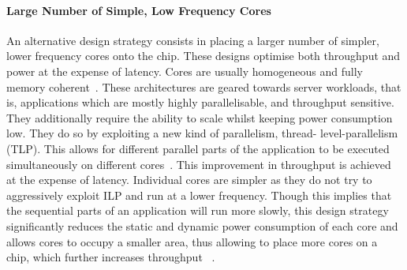\paragraph{Large Number of Simple, Low Frequency Cores} An alternative
design strategy consists in placing a larger number of simpler, lower frequency cores
onto the chip. These designs optimise both throughput and power at the expense of latency.
Cores are  usually homogeneous and fully memory coherent~\cite{Vajda:1414193}. These architectures are
geared towards server workloads, that is, applications which  are mostly highly 
parallelisable, and throughput sensitive. They additionally require the ability
to scale whilst keeping power consumption low.  They do so by exploiting a new kind of parallelism, thread-
level-parallelism (TLP). This allows for different parallel parts of the application
to be executed simultaneously on different cores~\cite{Borkar:2007:TCC:1278480.1278667}. This improvement in 
throughput is achieved at the
expense of latency. Individual cores are simpler as they do not try to aggressively
exploit ILP and run at a lower frequency. Though this implies that the
sequential parts of an application will run more slowly, this design
strategy significantly  reduces the static and dynamic
power consumption of each core and allows cores to occupy a smaller
area, thus allowing to place more cores on a chip, which further increases throughput
~\cite{Borkar:2007:TCC:1278480.1278667,4563876}. 



